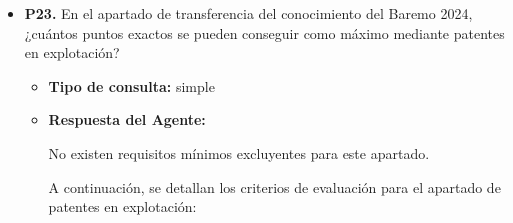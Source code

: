 \documentclass{article}
\begin{document}
\begin{itemize}
\begin{itemize}
                        Es importante destacar que la comisión de evaluación tendrá en cuenta la documentación acreditativa presentada por el candidato y podrá solicitar información adicional para confirmar la veracidad de los méritos alegados.
                  \item \textbf{Contexto utilizado:}

            \end{itemize}

      \item \textbf{P23.} En el apartado de transferencia del conocimiento del Baremo 2024, ¿cuántos puntos exactos se pueden conseguir como máximo mediante patentes en explotación? \\
            \begin{itemize}
                  \item \textbf{Tipo de consulta:} simple
                  \item \textbf{Respuesta del Agente:}

                        No existen requisitos mínimos excluyentes para este apartado.

                        A continuación, se detallan los criterios de evaluación para el apartado de patentes en explotación:


\end{itemize}
\end{itemize}
\end{document}
